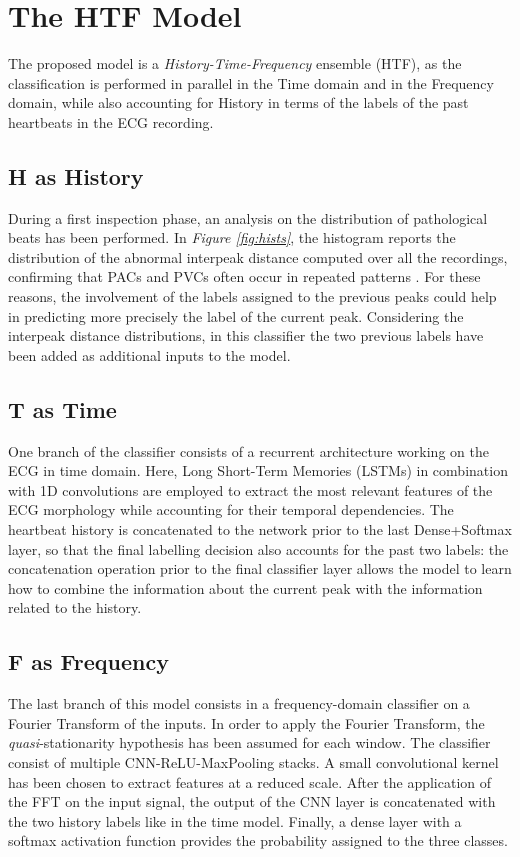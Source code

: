 \documentclass[conference]{IEEEtran}
\newcommand{\fig}[1]{\textit{Figure \ref{#1}}}
\begin{document}
\section{The HTF Model}
    The proposed model is a \textit{History-Time-Frequency} ensemble (HTF), as
    the classification is performed in parallel in the Time domain and in the
    Frequency domain, while also accounting for History in terms of the labels 
    of the past heartbeats in the ECG recording. 

\subsection{H as History}
    During a first inspection phase, an analysis on the distribution of
    pathological beats has been performed. In \fig{fig:hists}, the histogram
    reports the distribution of the abnormal interpeak distance computed over all the
    recordings, confirming that PACs and PVCs often occur in repeated
    patterns \cite{premature_v} \cite{frequent_premature}. For these reasons, 
    the involvement of the labels
    assigned to the previous peaks could help in predicting more precisely
    the label of the current peak. Considering the interpeak distance distributions,
    in this classifier the two previous labels have been added as additional
    inputs to the model.

\subsection{T as Time}
    One branch of the classifier consists of a recurrent architecture working on
    the ECG in time domain. Here, Long Short-Term Memories (LSTMs) in
    combination with 1D convolutions are employed to extract the most relevant
    features of the ECG morphology while accounting for their temporal
    dependencies. The heartbeat history is concatenated to the network prior to
    the last Dense+Softmax layer, so that the final labelling decision also
    accounts for the past two labels: the concatenation operation prior to
    the final classifier layer allows the model to learn how to combine the
    information about the current peak with the information related to the history.

\subsection{F as Frequency}
    The last branch of this model consists in a frequency-domain
    classifier on a Fourier Transform of the inputs. In order
    to apply the Fourier Transform, the \textit{quasi}-stationarity hypothesis has been
    assumed for each window.
    The classifier consist of multiple
    CNN-ReLU-MaxPooling stacks. A small convolutional kernel has been chosen to
    extract features at a reduced scale. After the
    application of the FFT on the input signal, the output of the CNN
    layer is concatenated with the two history labels like in the time
    model. Finally, a dense layer with a softmax activation function provides the
    probability assigned to the three classes.  
\end{document}
